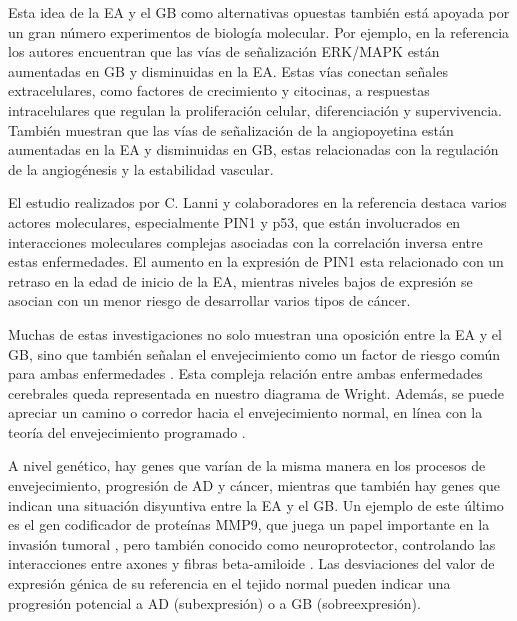 Esta idea de la EA y el GB como alternativas opuestas también está apoyada por un gran número experimentos de biología molecular. Por ejemplo, en la referencia \cite{Liu_2013} los autores encuentran que las vías de señalización ERK/MAPK están aumentadas en GB y disminuidas en la EA. Estas vías conectan señales extracelulares, como factores de crecimiento y citocinas, a respuestas intracelulares que regulan la proliferación celular, diferenciación y supervivencia. También muestran que las vías de señalización de la angiopoyetina están aumentadas en la EA y disminuidas en GB, estas relacionadas con la regulación de la angiogénesis y la estabilidad vascular.

El estudio realizados por C. Lanni y colaboradores en la referencia \cite{Lanni_2020} destaca varios actores moleculares, especialmente PIN1 y p53, que están involucrados en interacciones moleculares complejas asociadas con la correlación inversa entre estas enfermedades. El aumento en la expresión de PIN1 esta relacionado con un retraso en la edad de inicio de la EA, mientras niveles bajos de expresión se asocian con un menor riesgo de desarrollar varios tipos de cáncer.

Muchas de estas investigaciones no solo muestran una oposición entre la EA y el GB, sino que también señalan el envejecimiento como un factor de riesgo común para ambas enfermedades \cite{Driver_2012, Musicco_2013 , Liu_2013, Lanni_2020, A_Driver_2010}. Esta compleja relación entre ambas enfermedades cerebrales queda representada en nuestro diagrama de Wright. Además, se puede apreciar un camino o corredor hacia el envejecimiento normal, en línea con la teoría del envejecimiento programado \cite{Magalh_es_2012, 	Gems_2022}.

A nivel genético, hay genes que varían de la misma manera en los procesos de envejecimiento, progresión de AD y cáncer, mientras que también hay genes que indican una situación disyuntiva entre la EA y el GB. Un ejemplo de este último es el gen codificador de proteínas MMP9, que juega un papel importante en la invasión tumoral \cite{Choe2002, Xue_2017}, pero también conocido como neuroprotector, controlando las interacciones entre axones y fibras beta-amiloide \cite{Kaminari_2017}. Las desviaciones del valor de expresión génica de su referencia en el tejido normal pueden indicar una progresión potencial a AD (subexpresión) o a GB (sobreexpresión).

